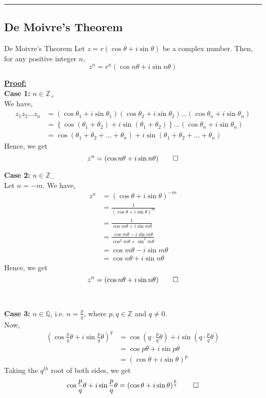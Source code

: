 \vspace{20pt}\rule{3in}{1pt}


\subsection{De Moivre's Theorem}
\begin{theorem}{De Moivre's Theorem}{}
    Let $z = r(\cos\theta + i\sin\theta)$ be a complex number. Then, for any positive integer $n$,
    \begin{equation}
        z^n = r^n(\cos n\theta + i\sin n\theta)
    \end{equation}
\end{theorem}

\underline{\textbf{Proof:}} \\
\textbf{Case 1:} $n \in \mathbb{Z_+}$ \\
We have,
\begin{align*}
    z_1 z_2 \ldots z_n &= (\cos\theta_1 + i\sin\theta_1) (\cos\theta_2 + i\sin\theta_2) \ldots (\cos\theta_n + i\sin\theta_n) \\
    &= \left\{ \cos(\theta_1 + \theta_2) + i\sin(\theta_1 + \theta_2) \right\} \ldots (\cos\theta_n + i\sin\theta_n) \\
    &= \cos(\theta_1 + \theta_2 + \ldots + \theta_n) + i\sin(\theta_1 + \theta_2 + \ldots + \theta_n)
\end{align*}
Hence, we get
\[
    z^n = (\cos n\theta + i\sin n\theta) \qed
\]

\pagebreak
\textbf{Case 2:} $n \in \mathbb{Z_-}$ \\
Let $n=-m$. We have,
\begin{align*}
    z^n &= (\cos\theta + i\sin\theta)^{-m} \\
    &= \frac{1}{(\cos\theta + i\sin\theta)^m} \\
    &= \frac{1}{\cos m\theta + i\sin m\theta} \\
    &= \frac{\cos m\theta - i\sin m\theta}{\cos^2 m\theta + \sin^2 m\theta} \\
    &= \cos m\theta - i\sin m\theta \\
    &= \cos n\theta + i\sin n\theta
\end{align*}
Hence, we get
\[
    z^n = (\cos n\theta + i\sin n\theta) \qed
\] \\~\\

\textbf{Case 3:} $n \in \mathbb{Q}$, i.e. $n = \frac{p}{q}$, where $p,q \in \mathbb{Z}$ and $q \neq 0$. \\
Now,
\begin{align*}
    \left( \cos \frac{p}{q}\theta + i\sin \frac{p}{q}\theta \right)^q &= \cos \left( q \cdot \frac{p}{q} \theta \right) + i\sin \left( q \cdot \frac{p}{q}\theta \right) \\
    &= \cos p\theta + i\sin p\theta \\
    &= (\cos\theta + i\sin\theta)^p
\end{align*}
Taking the $q^{th}$ root of both sides, we get
\[
    \cos \frac{p}{q}\theta + i\sin \frac{p}{q}\theta = \left( \cos\theta + i\sin\theta \right)^{\frac{p}{q}} \qed
\]

